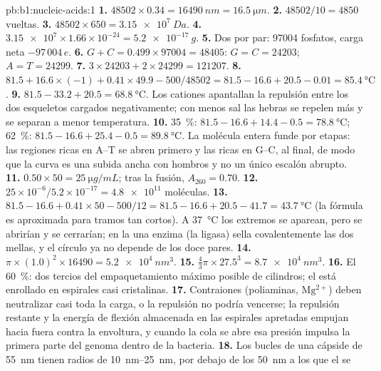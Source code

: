 \begin{solution}{pb:b1:nucleic-acids:1}
\textbf{1.} $\num{48502}\times 0.34 = \qty{16490}{nm} = \qty{16.5}{\micro m}$.
\textbf{2.} $\num{48502}/10 = 4850$ vueltas.
\textbf{3.} $\num{48502}\times 650 = \qty{3.15e7}{Da}$.
\textbf{4.} $\num{3.15e7}\times 1.66\times 10^{-24} = \qty{5.2e-17}{g}$.
\textbf{5.} Dos por par: \num{97004} fosfatos, carga neta $-97\,004\,e$.
\textbf{6.} $G + C = 0.499\times\num{97004} = \num{48405}$: $G = C =
\num{24203}$; $A = T = \num{24299}$.
\textbf{7.} $3\times\num{24203} + 2\times\num{24299} = \num{121207}$.
\textbf{8.} $81.5 + 16.6\times(-1) + 0.41\times 49.9 - 500/48502 =
81.5 - 16.6 + 20.5 - 0.01 = \qty{85.4}{\celsius}$.
\textbf{9.} $81.5 - 33.2 + 20.5 = \qty{68.8}{\celsius}$. Los cationes
apantallan la repulsión entre los dos esqueletos cargados negativamente; con
menos sal las hebras se repelen más y se separan a menor temperatura.
\textbf{10.} \qty{35}{\%}: $81.5 - 16.6 + 14.4 - 0.5 =
\qty{78.8}{\celsius}$; \qty{62}{\%}: $81.5 - 16.6 + 25.4 - 0.5 =
\qty{89.8}{\celsius}$. La molécula entera funde por etapas: las regiones
ricas en A--T se abren primero y las ricas en G--C, al final, de modo que la
curva es una subida ancha con hombros y no un único escalón abrupto.
\textbf{11.} $0.50\times 50 = \qty{25}{\micro g/mL}$; tras la fusión,
$A_{260} = 0.70$.
\textbf{12.} $25\times 10^{-6}/5.2\times 10^{-17} = \num{4.8e11}$ moléculas.
\textbf{13.} $81.5 - 16.6 + 0.41\times 50 - 500/12 = 81.5 - 16.6 + 20.5
- 41.7 = \qty{43.7}{\celsius}$ (la fórmula es aproximada para tramos tan
cortos). A \qty{37}{\celsius} los extremos se aparean, pero se abrirían y se
cerrarían; en la  una enzima (la ligasa) sella covalentemente las dos
mellas, y el círculo ya no depende de los doce pares.
\textbf{14.} $\pi\times(1.0)^2\times\num{16490} = \qty{5.2e4}{nm^3}$.
\textbf{15.} $\frac{4}{3}\pi\times 27.5^3 = \qty{8.7e4}{nm^3}$.
\textbf{16.} El \qty{60}{\%}: dos tercios del empaquetamiento máximo posible
de cilindros; el  está enrollado en espirales casi cristalinas.
\textbf{17.} Contraiones (poliaminas, $\mathrm{Mg^{2+}}$) deben neutralizar
casi toda la carga, o la repulsión no podría vencerse; la repulsión restante
y la energía de flexión almacenada en las espirales apretadas empujan hacia
fuera contra la envoltura, y cuando la cola se abre esa presión impulsa la
primera parte del genoma dentro de la bacteria.
\textbf{18.} Los bucles de una cápside de \qty{55}{nm} tienen radios de
\qtyrange{10}{25}{nm}, por debajo de los \qty{50}{nm} a los que el  se

\end{solution}
